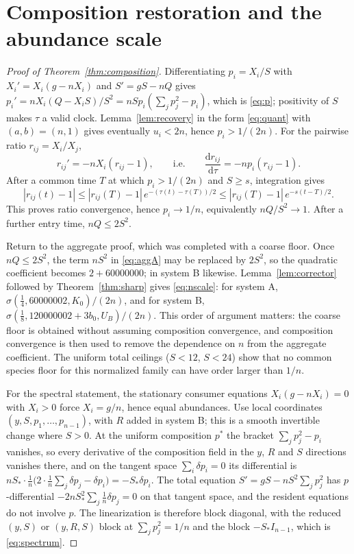 \documentclass[11pt,a4paper]{article}
\theoremstyle{plain}
\theoremstyle{definition}
\theoremstyle{remark}
\newcommand{\dd}{\mathrm d}
\begin{document}
\section{Composition restoration and the abundance scale}\label{sec:composition}
\begin{proof}[Proof of Theorem~\ref{thm:composition}]
Differentiating $p_i=X_i/S$ with $X_i'=X_i(g-nX_i)$ and $S'=gS-nQ$ gives $p_i'=nX_i(Q-X_iS)/S^2=nSp_i(\sum_jp_j^2-p_i)$, which is \eqref{eq:p}; positivity of $S$ makes $\tau$ a valid clock. Lemma~\ref{lem:recovery} in the form \eqref{eq:quant} with $(a,b)=(n,1)$ gives eventually $u_i<2n$, hence $p_i>1/(2n)$. For the pairwise ratio $r_{ij}=X_i/X_j$,
\[
r_{ij}'=-nX_i(r_{ij}-1),\qquad\text{i.e.}\qquad\frac{\dd r_{ij}}{\dd\tau}=-np_i(r_{ij}-1).
\]
After a common time $T$ at which $p_i>1/(2n)$ and $S\ge s$, integration gives
\begin{equation}\label{eq:rquant}
|r_{ij}(t)-1|\le|r_{ij}(T)-1|\,e^{-(\tau(t)-\tau(T))/2}\le|r_{ij}(T)-1|\,e^{-s(t-T)/2}.
\end{equation}
This proves ratio convergence, hence $p_i\to1/n$, equivalently $nQ/S^2\to1$. After a further entry time, $nQ\le2S^2$.

Return to the aggregate proof, which was completed with a coarse floor. Once $nQ\le2S^2$, the term $nS^2$ in \eqref{eq:aggA} may be replaced by $2S^2$, so the quadratic coefficient becomes $2+60000000$; in system B likewise. Lemma~\ref{lem:corrector} followed by Theorem~\ref{thm:sharp} gives \eqref{eq:nscale}: for system A, $\sigma(\tfrac14,60000002,K_0)/(2n)$, and for system B, $\sigma(\tfrac18,120000002+3b_0,U_B)/(2n)$. This order of argument matters: the coarse floor is obtained without assuming composition convergence, and composition convergence is then used to remove the dependence on $n$ from the aggregate coefficient. The uniform total ceilings ($S<12$, $S<24$) show that no common species floor for this normalized family can have order larger than $1/n$.

For the spectral statement, the stationary consumer equations $X_i(g-nX_i)=0$ with $X_i>0$ force $X_i=g/n$, hence equal abundances. Use local coordinates $(y,S,p_1,\dots,p_{n-1})$, with $R$ added in system B; this is a smooth invertible change where $S>0$. At the uniform composition $p^*$ the bracket $\sum_jp_j^2-p_i$ vanishes, so every derivative of the composition field in the $y$, $R$ and $S$ directions vanishes there, and on the tangent space $\sum_i\delta p_i=0$ its differential is $nS_*\cdot\tfrac1n\bigl(2\cdot\tfrac1n\sum_j\delta p_j-\delta p_i\bigr)=-S_*\delta p_i$. The total equation $S'=gS-nS^2\sum_jp_j^2$ has $p$-differential $-2nS_*^2\sum_j\tfrac1n\delta p_j=0$ on that tangent space, and the resident equations do not involve $p$. The linearization is therefore block diagonal, with the reduced $(y,S)$ or $(y,R,S)$ block at $\sum_jp_j^2=1/n$ and the block $-S_*I_{n-1}$, which is \eqref{eq:spectrum}.
\end{proof}
\end{document}

